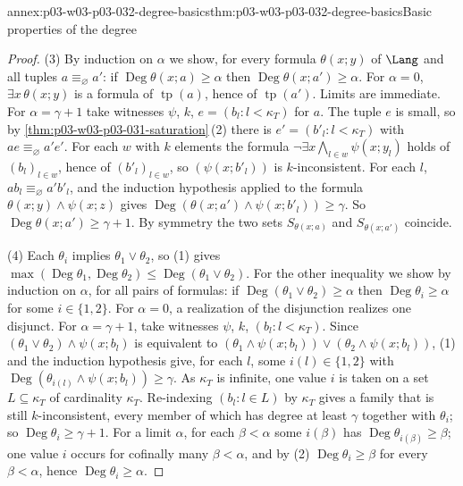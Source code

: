 \begin{annexitem}{annex:p03-w03-p03-032-degree-basics}{thm:p03-w03-p03-032-degree-basics}{Basic properties of the degree}
\begin{proof}
(3) By induction on \(\alpha\) we show, for every formula \(\theta(x;y)\) of
\(\Lang\) and all tuples \(a\equiv_\varnothing a'\): if
\(\operatorname{Deg}\theta(x;a)\geq\alpha\) then
\(\operatorname{Deg}\theta(x;a')\geq\alpha\).  For \(\alpha=0\),
\(\exists x\,\theta(x;y)\) is a formula of \(\operatorname{tp}(a)\), hence of
\(\operatorname{tp}(a')\).  Limits are immediate.  For \(\alpha=\gamma+1\)
take witnesses \(\psi\), \(k\), \(e=(b_l:l<\kappa_T)\) for \(a\).  The tuple
\(e\) is small, so by \cref{thm:p03-w03-p03-031-saturation}\,(2) there is
\(e'=(b'_l:l<\kappa_T)\) with \(ae\equiv_\varnothing a'e'\).  For each \(w\)
with \(k\) elements the formula
\(\neg\exists x\bigwedge_{l\in w}\psi(x;y_l)\) holds of \((b_l)_{l\in w}\),
hence of \((b'_l)_{l\in w}\), so \((\psi(x;b'_l))\) is \(k\)-inconsistent.
For each \(l\), \(ab_l\equiv_\varnothing a'b'_l\), and the induction
hypothesis applied to the formula \(\theta(x;y)\wedge\psi(x;z)\) gives
\(\operatorname{Deg}(\theta(x;a')\wedge\psi(x;b'_l))\geq\gamma\).  So
\(\operatorname{Deg}\theta(x;a')\geq\gamma+1\).  By symmetry the two sets
\(S_{\theta(x;a)}\) and \(S_{\theta(x;a')}\) coincide.

(4) Each \(\theta_i\) implies \(\theta_1\vee\theta_2\), so (1) gives
\(\max(\operatorname{Deg}\theta_1,\operatorname{Deg}\theta_2)\leq
\operatorname{Deg}(\theta_1\vee\theta_2)\).  For the other inequality we show
by induction on \(\alpha\), for all pairs of formulas: if
\(\operatorname{Deg}(\theta_1\vee\theta_2)\geq\alpha\) then
\(\operatorname{Deg}\theta_i\geq\alpha\) for some \(i\in\{1,2\}\).  For
\(\alpha=0\), a realization of the disjunction realizes one disjunct.  For
\(\alpha=\gamma+1\), take witnesses \(\psi\), \(k\), \((b_l:l<\kappa_T)\).
Since \((\theta_1\vee\theta_2)\wedge\psi(x;b_l)\) is equivalent to
\((\theta_1\wedge\psi(x;b_l))\vee(\theta_2\wedge\psi(x;b_l))\), (1) and the
induction hypothesis give, for each \(l\), some \(i(l)\in\{1,2\}\) with
\(\operatorname{Deg}(\theta_{i(l)}\wedge\psi(x;b_l))\geq\gamma\).  As
\(\kappa_T\) is infinite, one value \(i\) is taken on a set
\(L\subseteq\kappa_T\) of cardinality \(\kappa_T\).  Re-indexing
\((b_l:l\in L)\) by \(\kappa_T\) gives a family that is still
\(k\)-inconsistent, every member of which has degree at least \(\gamma\)
together with \(\theta_i\); so \(\operatorname{Deg}\theta_i\geq\gamma+1\).
For a limit \(\alpha\), for each \(\beta<\alpha\) some \(i(\beta)\) has
\(\operatorname{Deg}\theta_{i(\beta)}\geq\beta\); one value \(i\) occurs for
cofinally many \(\beta<\alpha\), and by (2)
\(\operatorname{Deg}\theta_i\geq\beta\) for every \(\beta<\alpha\), hence
\(\operatorname{Deg}\theta_i\geq\alpha\).


\end{proof}
\end{annexitem}
